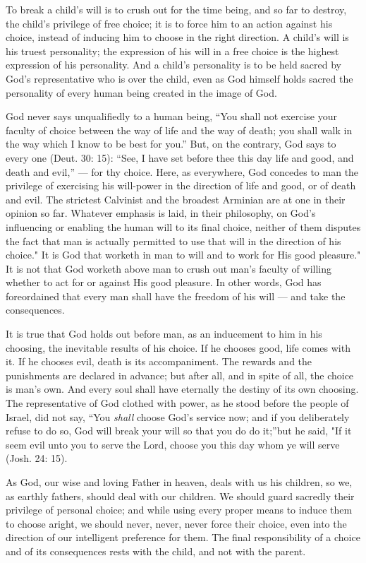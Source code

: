 \documentclass[
]{book}
\begin{document}
To break a child's will is to crush out for the time being, and so far to destroy, the child's privilege of free choice; it is to force him to an action against his choice, instead of inducing him to choose in the right direction. A child's will is his truest personality; the expression of his will in a free choice is the highest expression of his personality. And a child's personality is to be held sacred by God's representative who is over the child, even as God himself holds sacred the personality of every human being created in the image of God.

God never says unqualifiedly to a human being, ``You shall not exercise your faculty of choice between the way of life and the way of death; you shall walk in the way which I know to be best for you.'' But, on the contrary, God says to every one (Deut. 30: 15): ``See, I have set before thee this day life and good, and death and evil,'' --- for thy choice. Here, as everywhere, God concedes to man the privilege of exercising his will-power in the direction of life and good, or of death and evil. The strictest Calvinist and the broadest Arminian are at one in their opinion so far. Whatever emphasis is laid, in their philosophy, on God's influencing or enabling the human will to its final choice, neither of them disputes the fact that man is actually permitted to use that will in the direction of his choice." It is God that worketh in man to will and to work for His good pleasure." It is not that God worketh above man to crush out man's faculty of willing whether to act for or against His good pleasure. In other words, God has foreordained that every man shall have the freedom of his will --- and take the consequences.

It is true that God holds out before man, as an inducement to him in his choosing, the inevitable results of his choice. If he chooses good, life comes with it. If he chooses evil, death is its accompaniment. The rewards and the punishments are declared in advance; but after all, and in spite of all, the choice is man's own. And every soul shall have eternally the destiny of its own choosing. The representative of God clothed with power, as he stood before the people of Israel, did not say, ``You \emph{shall} choose God's service now; and if you deliberately refuse to do so, God will break your will so that you do do it;''but he said, "If it seem evil unto you to serve the Lord, choose you this day whom ye will serve (Josh. 24: 15).

As God, our wise and loving Father in heaven, deals with us his children, so we, as earthly fathers, should deal with our children. We should guard sacredly their privilege of personal choice; and while using every proper means to induce them to choose aright, we should never, never, never force their choice, even into the direction of our intelligent preference for them. The final responsibility of a choice and of its consequences rests with the child, and not with the parent.
\end{document}
